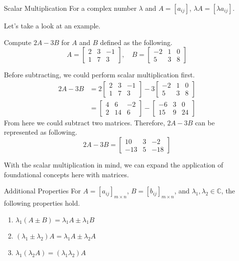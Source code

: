 \documentclass[../../main.tex]{subfiles}
\begin{document}
\begin{theorem}{}{Scalar Multiplication}
For a complex number $\lambda$ and $A = [a_{ij}]$, $\lambda A
= [\lambda a_{ij}]$.
\end{theorem}

Let's take a look at an example.

\begin{problem}{}{}
Compute $2A - 3B$ for $A$ and $B$ defined as the following.
\[
A =
\begin{bmatrix}
    2 & 3 & -1 \\
    1 & 7 & 3
\end{bmatrix},
\quad
B =
\begin{bmatrix}
    -2 & 1 & 0 \\
    5  & 3 & 8
\end{bmatrix}
\]
\end{problem}
\begin{solution}
Before subtracting, we could perform scalar multiplication first.
\begin{align*}
2A - 3B
&=
2\begin{bmatrix}
    2 & 3 & -1 \\
    1 & 7 & 3
\end{bmatrix}
-
3\begin{bmatrix}
    -2 & 1 & 0 \\
    5  & 3 & 8
\end{bmatrix} \\
&=
\begin{bmatrix}
    4 & 6  & -2 \\
    2 & 14 & 6
\end{bmatrix}
-
\begin{bmatrix}
    -6 & 3 & 0 \\
    15 & 9 & 24
\end{bmatrix}
\end{align*}
From here we could subtract two matrices. Therefore, $2A - 3B$
can be represented as following.
\[
2A - 3B =
\begin{bmatrix}
    10  & 3  & -2 \\
    -13 & 5 & -18
\end{bmatrix}
\]
\end{solution}

With the scalar multiplication in mind, we can expand the application
of foundational concepts here with matrices.

\begin{theorem}{}{Additional Properties}
For $A = [a_{ij}]_{m \times n}$, $B = [b_{ij}]_{m \times n}$,
and $\lambda_1, \lambda_2 \in \mathbb{C}$, the following
properties hold.
\begin{enumerate}
\item $\lambda_1 (A \pm B) = \lambda_1 A \pm \lambda_1 B$
\item $(\lambda_1 \pm \lambda_2) A = \lambda_1 A \pm \lambda_2 A$
\item $\lambda_1 (\lambda_2 A) = (\lambda_1 \lambda_2) A$
\end{enumerate}
\end{theorem}
\end{document}
